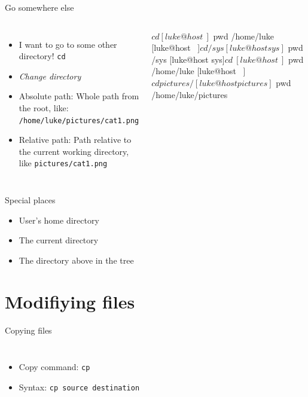     \begin{frame}[t,fragile]{Go somewhere else}
        \begin{columns}[T]
            \begin{itemize}
                \item I want to go to some other directory! \textrightarrow \: \texttt{cd}
                \item \emph{Change directory}
                \item Absolute path: Whole path from the root, like:
                    \texttt{/home/luke/pictures/cat1.png}
                \item Relative path: Path relative to the current working
                    directory, like \texttt{pictures/cat1.png}
            \end{itemize}
            \begin{bashenv}$ cd
[luke@host ~]$ pwd
/home/luke
[luke@host ~]$ cd /sys
[luke@host sys]$ pwd
/sys
[luke@host sys]$ cd ~
[luke@host ~]$ pwd
/home/luke
[luke@host ~]$ cd pictures/
[luke@host pictures]$ pwd
/home/luke/pictures
            \end{bashenv}
        \end{columns}
    \end{frame}

    \begin{frame}[t,fragile]{Special places}
        \begin{itemize}
            \item{\makebox[1.3cm]{\:\texttt{\textasciitilde\hfill}}User's home directory}
            \item{The current directory}
            \item{The directory above in the tree}
        \end{itemize}
    \end{frame}

    \section{Modifiying files}

    \begin{frame}[t,fragile]{Copying files}
        \begin{columns}[T]
                \begin{itemize}
                    \item Copy command: \texttt{cp}
                    \item Syntax: \texttt{cp source destination}
                \end{itemize}
        \end{columns}
    \end{frame}

